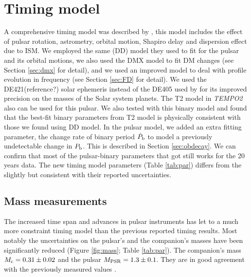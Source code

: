 \section{Timing model}
\label{sec:model}
A comprehensive timing model was described by \citet{sns+05}, this model includes the effect of pulsar rotation, astrometry, orbital motion, Shapiro delay and dispersion effect due to ISM.
We employed the same \citet{dd86} (DD) model they used to fit for the pulsar and
its orbital motions, we also used the DMX model to fit DM changes (see Section
\ref{sec:dmx} for detail), and we used an improved model to deal with profile
evolution in frequency (see Section \ref{sec:FD} for detail). 
We used the DE421(reference?) solar ephemeris instead of the DE405 used by
\citet{sns+05} for its improved precision on the masses of the Solar system planets. The T2 model \citep{??} in \textit{TEMPO2} \citep{hem06} also can be used for this pulsar. We also tested with this binary model and found that the best-fit binary parameters from T2 model is physically consistent with those we found using DD model.
In the pulsar model, we added an extra fitting parameter, the change rate of binary period $\dot{P}_{\rm b}$ to model a previously undetectable change in $P_{\rm b}$. This is described in Section \ref{sec:obdecay}.    
We can confirm that most of the pulsar-binary parameters that \citet{sns+05} got still works for the 20 years data. The new timing model parameters (Table \ref{tab:par}) differs from the \citet{sns+05} slightly but consistent with their reported uncertainties.



\subsection{Mass measurements}
\label{sec:mass}
The increased time span and advances in pulsar instruments has let to a much
more constraint timing model than the previous reported timing results. Most
notably the uncertainties on the pulsar's and the companion's masses have been
significantly reduced (Figure \ref{fig:mass}; Table \ref{tab:par}). The
companion's mass $M_{\rm c} = 0.31\pm0.02$ and the pulsar $M_{\rm PSR}=1.3\pm0.1$. They are in
good agreement with the previously measured values \cite{sns+05}.

